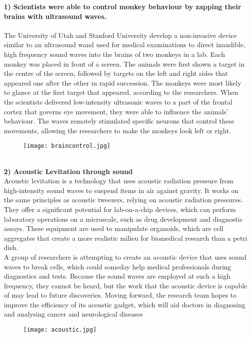 \documentclass[12pt]{article}
\begin{document}
\begin{large}
{\large \textbf{1) Scientists were able to control monkey behaviour by zapping their brains with ultrasound waves.}}\\
\\
The University of Utah and Stanford University develop a non-invasive device similar to an ultrasound wand used for medical examinations to direct inaudible, high frequency sound waves into the brains of two monkeys in a lab. Each monkey was placed in front of a screen. The animals were first shown a target in the centre of the screen, followed by targets on the left and right sides that appeared one after the other in rapid succession. The monkeys were most likely to glance at the first target that appeared, according to the researchers. When the scientists delivered low-intensity ultrasonic waves to a part of the frontal cortex that governs eye movement, they were able to influence the animals' behaviour. The waves remotely stimulated specific neurons that control these movements, allowing the researchers to make the monkeys look left or right.
\\
\begin{figure}[h]
\centering
\texttt{[image: braincontrol.jpg]}
\end{figure}
\\

{\large \textbf{2) Acoustic Levitation through sound}}\\

{\large Acoustic levitation is a technology that uses acoustic radiation pressure from high-intensity sound waves to suspend items in air against gravity. It works on the same principles as acoustic tweezers, relying on acoustic radiation pressures. They offer a significant potential for lab-on-a-chip devices, which can perform laboratory operations on a microscale, such as drug development and diagnostic assays. These equipment are used to manipulate organoids, which are cell aggregates that create a more realistic milieu for biomedical research than a petri dish.\\
A group of researchers is attempting to create an acoustic device that uses sound waves to break cells, which could someday help medical professionals during diagnostics and tests. Because the sound waves are employed at such a high frequency, they cannot be heard, but the work that the acoustic device is capable of may lead to future discoveries. Moving forward, the research team hopes to improve the efficiency of its acoustic gadget, which will aid doctors in diagnosing and analysing cancer and neurological diseases}
\begin{figure}[h]
\centering
\texttt{[image: acoustic.jpg]}
\end{figure}
 

\end{large}
\end{document}
